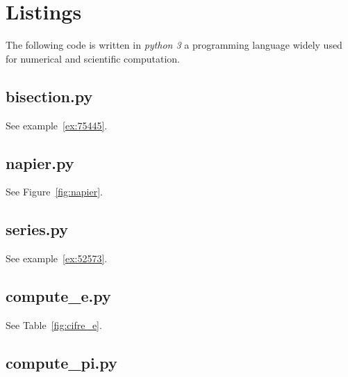 \chapter{Listings}

The following code is written in \emph{python 3}%
a programming language
widely used for numerical and scientific computation.


\section{bisection.py}

See example~\ref{ex:75445}.
\label{code:bisection}


\section{napier.py}

See Figure~\ref{fig:napier}.
\label{code:napier}


\section{series.py}

See example~\ref{ex:52573}.
\label{code:series}


\section{compute\_e.py}

See Table~\ref{fig:cifre_e}.
\label{code:compute_e}


\section{compute\_pi.py}

